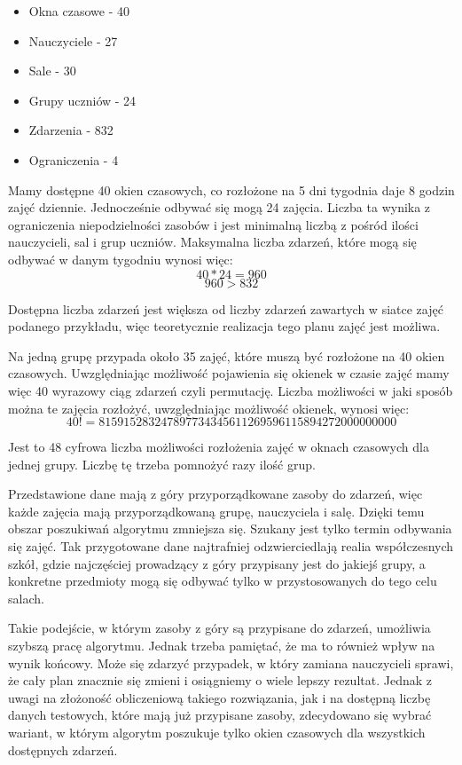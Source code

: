 \begin{itemize}
	\item Okna czasowe - 40
	\item Nauczyciele - 27
	\item Sale - 30
	\item Grupy uczniów - 24
	\item Zdarzenia - 832
	\item Ograniczenia - 4
\end{itemize}

Mamy dostępne 40 okien czasowych, co rozłożone na 5 dni tygodnia daje 8 godzin zajęć dziennie. Jednocześnie odbywać się mogą 24 zajęcia. Liczba ta wynika z ograniczenia niepodzielności zasobów i jest minimalną liczbą z pośród ilości nauczycieli, sal i grup uczniów. Maksymalna liczba zdarzeń, które mogą się odbywać w danym tygodniu wynosi więc:
\[ 40 * 24 = 960 \]
\[ 960 > 832 \]

Dostępna liczba zdarzeń jest większa od liczby zdarzeń zawartych w siatce zajęć podanego przykładu, więc teoretycznie realizacja tego planu zajęć jest możliwa.

Na jedną grupę przypada około 35 zajęć, które muszą być rozłożone na 40 okien czasowych. Uwzględniając możliwość pojawienia się okienek w czasie zajęć mamy więc 40 wyrazowy ciąg zdarzeń czyli permutację. Liczba możliwości w jaki sposób można te zajęcia rozłożyć, uwzględniając możliwość okienek, wynosi więc:
\[40! = 815915283247897734345611269596115894272000000000\]

Jest to 48 cyfrowa liczba możliwości rozłożenia zajęć w oknach czasowych dla jednej grupy. Liczbę tę trzeba pomnożyć razy ilość grup.

Przedstawione dane mają z góry przyporządkowane zasoby do zdarzeń, więc każde zajęcia mają przyporządkowaną grupę, nauczyciela i salę. Dzięki temu obszar poszukiwań algorytmu zmniejsza się. Szukany jest tylko termin odbywania się zajęć. Tak przygotowane dane najtrafniej odzwierciedlają realia współczesnych szkół, gdzie najczęściej prowadzący z góry przypisany jest do jakiejś grupy, a konkretne przedmioty mogą się odbywać tylko w przystosowanych do tego celu salach.

Takie podejście, w którym zasoby z góry są przypisane do zdarzeń, umożliwia szybszą pracę algorytmu. Jednak trzeba pamiętać, że ma to również wpływ na wynik końcowy. Może się zdarzyć przypadek, w który zamiana nauczycieli sprawi, że cały plan znacznie się zmieni i osiągniemy o wiele lepszy rezultat. Jednak z uwagi na złożoność obliczeniową takiego rozwiązania, jak i na dostępną liczbę danych testowych, które mają już przypisane zasoby, zdecydowano się wybrać wariant, w którym algorytm poszukuje tylko okien czasowych dla wszystkich dostępnych zdarzeń.